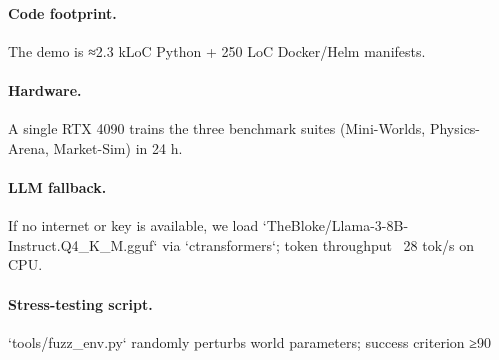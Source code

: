 \paragraph{Code footprint.}  
The demo is ≈2.3 kLoC Python + 250 LoC Docker/Helm manifests.

\paragraph{Hardware.}  
A single RTX 4090 trains the
three benchmark suites (Mini-Worlds, Physics-Arena, Market-Sim) in 24 h.

\paragraph{LLM fallback.}  
If no internet or key is available, we load
`TheBloke/Llama-3-8B-Instruct.Q4_K_M.gguf` via `ctransformers`;
token throughput ~28 tok/s on CPU.

\paragraph{Stress-testing script.}  
`tools/fuzz_env.py` randomly perturbs world
parameters; success criterion ≥90 %

\printbibliography

